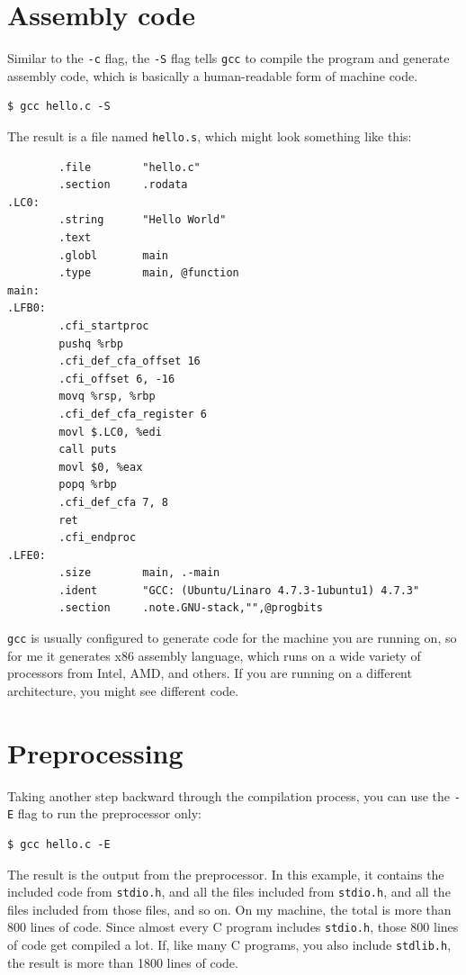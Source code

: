 \documentclass[12pt]{book}
\begin{document}
\section{Assembly code}

Similar to the {\tt -c} flag, the {\tt -S} flag tells {\tt gcc}
to compile the program and generate assembly code, which is basically
a human-readable form of machine code.

\begin{verbatim}
$ gcc hello.c -S
\end{verbatim}

The result is a file named {\tt hello.s}, which might look something like
this:

\begin{verbatim}
        .file        "hello.c"
        .section     .rodata
.LC0:
        .string      "Hello World"
        .text
        .globl       main
        .type        main, @function
main:
.LFB0:
        .cfi_startproc
        pushq %rbp
        .cfi_def_cfa_offset 16
        .cfi_offset 6, -16
        movq %rsp, %rbp
        .cfi_def_cfa_register 6
        movl $.LC0, %edi
        call puts
        movl $0, %eax
        popq %rbp
        .cfi_def_cfa 7, 8
        ret
        .cfi_endproc
.LFE0:
        .size        main, .-main
        .ident       "GCC: (Ubuntu/Linaro 4.7.3-1ubuntu1) 4.7.3"
        .section     .note.GNU-stack,"",@progbits
\end{verbatim}

{\tt gcc} is usually configured to generate code for the machine you
are running on, so for me it generates x86 assembly language,
which runs on a wide variety of processors from Intel, AMD, and
others.  If you are running on a different architecture, you might
see different code.


\section{Preprocessing}

Taking another step backward through the compilation process, you
can use the {\tt -E} flag to run the preprocessor only:

\begin{verbatim}
$ gcc hello.c -E
\end{verbatim}

The result is the output from the preprocessor.  In this example,
it contains the included code from {\tt stdio.h}, and all the files
included from {\tt stdio.h}, and all the files included from those
files, and so on.  On my machine, the total is more than 800 lines
of code.  Since almost every C program includes {\tt stdio.h}, those
800 lines of code get compiled a lot.  If, like many C programs,
you also include {\tt stdlib.h}, the result is more than 1800 lines
of code.
\end{document}
